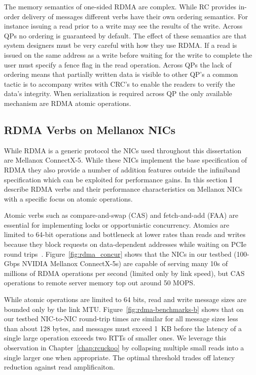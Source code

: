 \documentclass[12pt]{ucsddissertation}
\begin{document}
The memory semantics of one-sided RDMA are complex. While RC provides in-order delivery of messages
different verbs have their own ordering semantics. For instance issuing a read prior to a write may
see the results of the write. Across QPs no ordering is guaranteed by default. The effect of these
semantics are that system designers must be very careful with how they use RDMA. If a read is issued
on the same address as a write before waiting for the write to complete the user must specify a
fence flag in the read operation. Across QPs the lack of ordering means that partially written data
is visible to other QP's a common tactic is to accompany writes with CRC's to enable the readers to
verify the data's integrity. When serialization is required across QP the only available mechanism
are RDMA atomic operations.



\subsection{RDMA Verbs on Mellanox NICs}

While RDMA is a generic protocol the NICs used throughout this dissertation are Mellanox ConnectX-5.
While these NICs implement the base specification of RDMA they also provide a number of addition
features outside the infiniband specification which can be exploited for performance gains.  In this
section I describe RDMA verbs and their performance characteristics on Mellanox NICs with a specific
focus on atomic operations.

Atomic verbs such as compare-and-swap (CAS) and fetch-and-add (FAA) are essential for implementing
locks or opportunistic concurrency. Atomics are limited to 64-bit operations and bottleneck at lower
rates than reads and writes because they block requests on data-dependent addresses while waiting on
PCIe round trips~\cite{design-guidelines,sherman}.  Figure~\ref{fig:rdma_concur} shows that the NICs
in our testbed (100-Gbps NVIDIA Mellanox ConnectX-5s) are capable of serving many 10s of millions of
RDMA operations per second (limited only by link speed), but CAS operations to remote server memory
top out around 50 MOPS.  


While atomic operations are limited to 64 bits, read and write message sizes are bounded only by the
link MTU.
Figure~\ref{fig:rdma-benchmarks-b} shows that on our testbed NIC-to-NIC round-trip times are similar
for all message sizes less than about 128 bytes, and
messages must exceed 1~KB before the latency of a single large operation exceeds two RTTs of smaller
ones.  We leverage this observation in Chapter~\ref{chap:rcuckoo} by collapsing multiple small reads
into a single larger one when appropriate.  The optimal threshold trades off latency reduction
against read amplificaiton.
\end{document}

